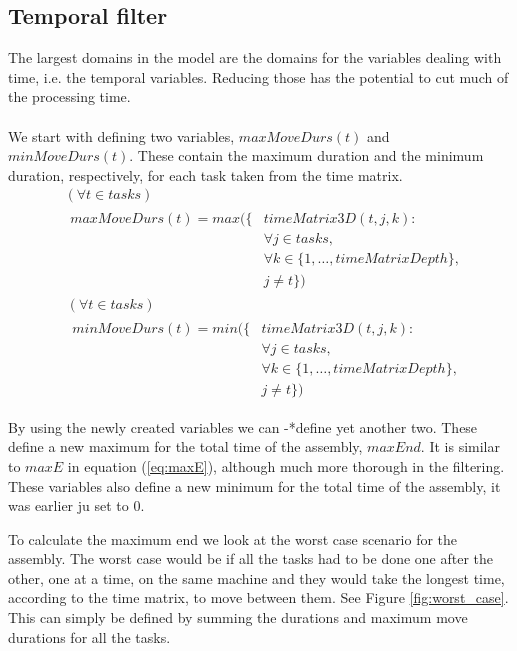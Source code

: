 \subsection{Temporal filter}
  The largest domains in the model are the domains for the variables dealing with time, i.e. the temporal variables. Reducing those has the potential to cut much of the processing time.
  \\\\
   We start with defining two variables, $maxMoveDurs(t)$ and $minMoveDurs(t)$. These contain the maximum duration and the minimum duration, respectively, for each task taken from the time matrix.
  \begin{equation}
  \begin{aligned}\label{eq:57}
  &( \forall t \in tasks)\\
  &\begin{aligned}
  maxMoveDurs(t) = max(\{&timeMatrix3D(t,j,k) :\\
  &\forall j \in tasks, \\
  &\forall k \in \{1 , \ldots , timeMatrixDepth\},\\
  &j \neq t\})
  \end{aligned}
  \end{aligned}
  \end{equation}
   \begin{equation}
   \begin{aligned}\label{eq:58}
   &(\forall t \in tasks)\\
   &\begin{aligned}
   minMoveDurs(t) = min(\{&timeMatrix3D(t,j,k) :\\
   &\forall j \in tasks, \\
   &\forall k \in \{1 , \ldots , timeMatrixDepth\},\\
   &j \neq t\})
   \end{aligned}
   \end{aligned}
   \end{equation}

  \noindent By using the newly created variables we can -*define yet another two. These define a new maximum for the total time of the assembly, $maxEnd$. It is similar to $maxE$ in equation (\ref{eq:maxE}), although much more thorough in the filtering. These variables also define a new minimum for the total time of the assembly, it was earlier ju set to 0.
   
   To calculate the maximum end we look at the worst case scenario for the assembly. The worst case would be if all the tasks had to be done one after the other, one at a time, on the same machine and they would take the longest time, according to the time matrix, to move between them. See Figure \ref{fig:worst_case}. This can simply be defined by summing the durations and maximum move durations for all the tasks.
   
